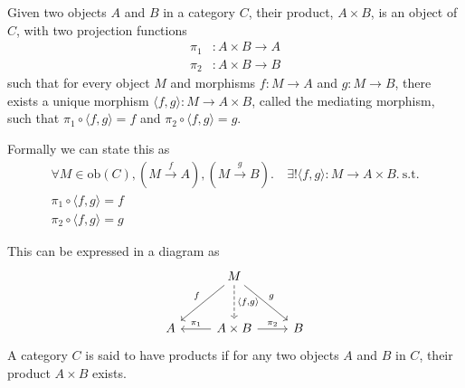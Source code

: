 \documentclass[10pt]{article}
\begin{document}
\begin{definition}[Products]
  Given two objects $A$ and $B$ in a category $C$, their product, $A \times B$, is an object of $C$, with two projection functions
  \[
    \begin{aligned}
      \pi_1 & : A \times B \rightarrow A \\
      \pi_2 & : A \times B \rightarrow B
    \end{aligned}
  \]
  such that for every object $M$ and morphisms $f : M \rightarrow A$ and $g : M \rightarrow B$, there exists a unique morphism $\langle f, g \rangle : M \rightarrow A \times B$, called the mediating morphism, such that $\pi_1 \circ \langle f, g \rangle = f$ and $\pi_2 \circ \langle f, g \rangle = g$.

  Formally we can state this as
  \[
    \begin{aligned}
      \forall M \in \text{ob}(C), (M \xrightarrow{f} A), (M \xrightarrow{g} B).\ & \exists ! \langle f, g \rangle : M \rightarrow A \times B.\ \text{s.t.} \\
      \pi_1 \circ \langle f, g \rangle = f \\
      \pi_2 \circ \langle f, g \rangle = g
    \end{aligned}
  \]

  This can be expressed in a diagram as
  \begin{equation}
    \begin{tikzcd}[row sep=large]
      &
      M  \arrow[dl,swap,"f"] \arrow[dr,"g"] \arrow[d, dashed, "\langle {f, g} \rangle"] &
      \\
      A & A\times B \arrow[l, "\pi_1"'] \arrow[r, "\pi_2"] & B
    \end{tikzcd}
    \label{eq:product}
  \end{equation}
  A category $C$ is said to have products if for any two objects $A$ and $B$ in $C$, their product $A \times B$ exists.
\end{definition}
\end{document}
